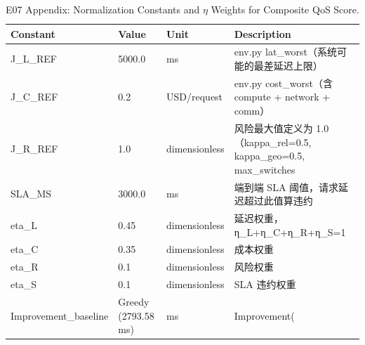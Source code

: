 \begin{table}[htbp]
\centering
\caption{E07 Appendix: Normalization Constants and $\eta$ Weights for Composite QoS Score.}
\label{tab:e07_normalization}
\begin{tabular}{llll}
\toprule
Constant & Value & Unit & Description \\
\midrule
J\_L\_REF & 5000.0 & ms & env.py lat\_worst（系统可能的最差延迟上限） \\
J\_C\_REF & 0.2 & USD/request & env.py cost\_worst（含 compute + network + comm） \\
J\_R\_REF & 1.0 & dimensionless & 风险最大值定义为 1.0（kappa\_rel=0.5, kappa\_geo=0.5, max\_switches \\
SLA\_MS & 3000.0 & ms & 端到端 SLA 阈值，请求延迟超过此值算违约 \\
eta\_L & 0.45 & dimensionless & 延迟权重，η\_L+η\_C+η\_R+η\_S=1 \\
eta\_C & 0.35 & dimensionless & 成本权重 \\
eta\_R & 0.1 & dimensionless & 风险权重 \\
eta\_S & 0.1 & dimensionless & SLA 违约权重 \\
Improvement\_baseline & Greedy (2793.58 ms) & ms & Improvement(%
\bottomrule
\end{tabular}
\end{table}
